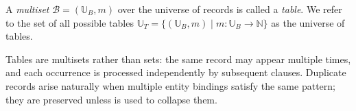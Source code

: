 \begin{frameddef}[Tables]
A \emph{multiset} $\mathcal{B} = (\mathbb{U}_B, m)$ over the universe of records is called a \emph{table}. We refer to the set of all possible tables $\mathbb{U}_T = \{ (\mathbb{U}_B, m) \mid m : \mathbb{U}_B \to \mathbb{N} \}$ as the universe of tables.
\end{frameddef}

Tables are multisets rather than sets: the same record may appear multiple times, and each occurrence is processed independently by subsequent clauses. Duplicate records arise naturally when multiple entity bindings satisfy the same pattern; they are preserved unless  is used to collapse them.
